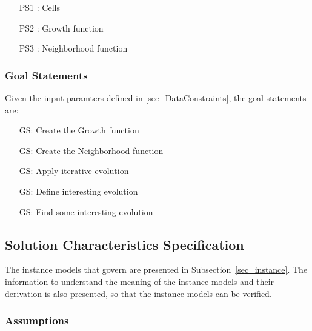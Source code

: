 \documentclass[12pt]{article}
\newcounter{goalnum} %
\begin{document}
\begin{itemize}

\item[PS1 :] Cells

\item[PS2 :] Growth function

\item[PS3 :] Neighborhood function

\end{itemize}

\subsubsection{Goal Statements}

\noindent Given the input paramters defined in \ref{sec_DataConstraints}, the goal statements are:

\begin{itemize}

\item[GS\refstepcounter{goalnum}\thegoalnum \label{G_GFCT}:] Create the Growth function

\item[GS\refstepcounter{goalnum}\thegoalnum \label{G_meaningfulLabel}:] Create the Neighborhood function

\item[GS\refstepcounter{goalnum}\thegoalnum \label{G_meaningfulLabel}:] Apply iterative evolution

\item[GS\refstepcounter{goalnum}\thegoalnum \label{G_meaningfulLabel}:] Define interesting evolution

\item[GS\refstepcounter{goalnum}\thegoalnum \label{G_meaningfulLabel}:] Find some interesting evolution

\end{itemize}

\subsection{Solution Characteristics Specification}

The instance models that govern \progname{} are presented in
Subsection~\ref{sec_instance}.  The information to understand the meaning of the
instance models and their derivation is also presented, so that the instance
models can be verified.


\subsubsection{Assumptions} \label{sec_assumpt}
\end{document}
